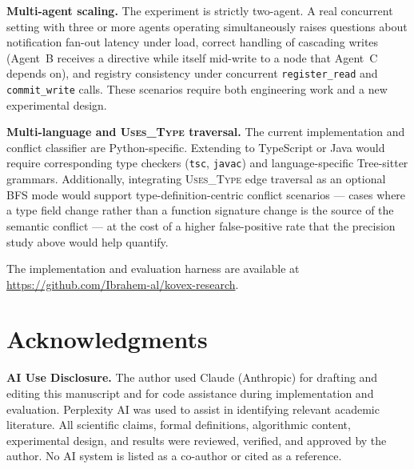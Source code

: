 \documentclass[12pt]{article}
\begin{document}
\textbf{Multi-agent scaling.}
The experiment is strictly two-agent. A real concurrent setting with three or
more agents operating simultaneously raises questions about notification fan-out
latency under load, correct handling of cascading writes (Agent~B receives a
directive while itself mid-write to a node that Agent~C depends on), and
registry consistency under concurrent \texttt{register\_read} and
\texttt{commit\_write} calls. These scenarios require both engineering work and
a new experimental design.

\textbf{Multi-language and \textsc{Uses\_Type} traversal.}
The current implementation and conflict classifier are Python-specific. Extending
to TypeScript or Java would require corresponding type checkers (\texttt{tsc},
\texttt{javac}) and language-specific Tree-sitter grammars. Additionally,
integrating \textsc{Uses\_Type} edge traversal as an optional BFS mode would
support type-definition-centric conflict scenarios --- cases where a type field
change rather than a function signature change is the source of the semantic
conflict --- at the cost of a higher false-positive rate that the precision
study above would help quantify.

The implementation and evaluation harness are available at
\url{https://github.com/Ibrahem-al/kovex-research}.

\section*{Acknowledgments}

\noindent\textbf{AI Use Disclosure.}
The author used Claude (Anthropic) for drafting and editing this manuscript
and for code assistance during implementation and evaluation. Perplexity AI
was used to assist in identifying relevant academic literature. All scientific
claims, formal definitions, algorithmic content, experimental design, and
results were reviewed, verified, and approved by the author. No AI system is
listed as a co-author or cited as a reference.



\end{document}
